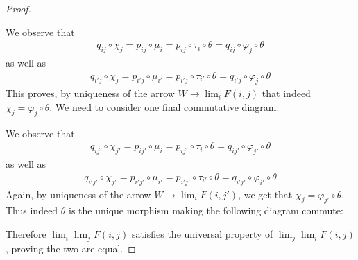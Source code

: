 \documentclass{article}
\newcommand{\id}{\mathrm{id}}
\begin{document}
\begin{proof}
\begin{center}
        \end{center}
        We observe that 
        \begin{align*}
            q_{ij}\circ \chi_j=p_{ij}\circ \mu_i=p_{ij}\circ \tau_i \circ \theta=q_{ij}\circ \varphi_j \circ \theta
        \end{align*}
        as well as
        \begin{align*}
            q_{i'j}\circ \chi_j=p_{i'j}\circ \mu_{i'}=p_{i'j}\circ \tau_{i'}\circ \theta=q_{i'j}\circ \varphi_j\circ \theta
        \end{align*}
        This proves, by uniqueness of the arrow $W\to \lim_i F(i,j)$ that indeed $\chi_j=\varphi_j\circ \theta$. We need to consider one final commutative diagram:
        \begin{center}
        \end{center}
        We observe that
            \begin{align*}
                q_{ij'}\circ \chi_{j'}=p_{ij'}\circ \mu_i=p_{ij'}\circ \tau_i\circ \theta=q_{ij'}\circ \varphi_{j'}\circ \theta
            \end{align*}
            as well as
            \begin{align*}
                q_{i'j'}\circ \chi_{j'}=p_{i'j'}\circ \mu_{i'}=p_{i'j'}\circ \tau_{i'}\circ \theta=q_{i'j'}\circ \varphi_{i'}\circ \theta
            \end{align*}
            Again, by uniqueness of the arrow $W\to \lim_i F(i,j')$, we get that $\chi_j=\varphi_{j'}\circ \theta$. Thus indeed $\theta$ is the unique morphism making the following diagram commute:
            \begin{center}
        \end{center}
        Therefore $\lim_i\lim_j F(i,j)$ satisfies the universal property of $\lim_j \lim_i F(i,j)$, proving the two are equal.
\end{proof}
\end{document}
